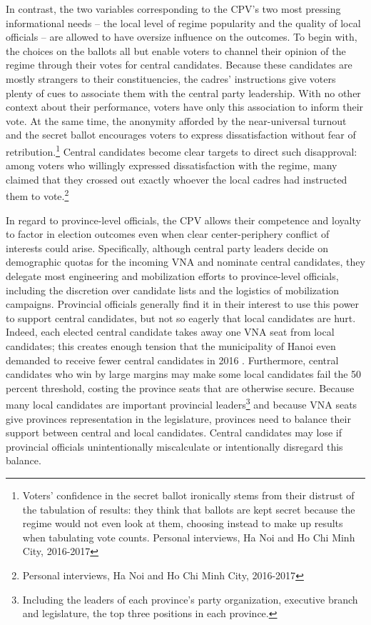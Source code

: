 \documentclass[12pt]{article}
\newcommand{\1}{\mathbbm{1}}
\begin{document}
In contrast, the two variables corresponding to the CPV's two most pressing informational needs -- the local level of regime popularity and the quality of local officials -- are allowed to have oversize influence on the outcomes. To begin with, the choices on the ballots all but enable voters to channel their opinion of the regime through their votes for central candidates. Because these candidates are mostly strangers to their constituencies, the cadres' instructions give voters plenty of cues to associate them with the central party leadership. With no other context about their performance, voters have only this association to inform their vote. At the same time, the anonymity afforded by the near-universal turnout and the secret ballot encourages voters to express dissatisfaction without fear of retribution.\footnote{Voters' confidence in the secret ballot ironically stems from their distrust of the tabulation of results: they think that ballots are kept secret because the regime would not even look at them, choosing instead to make up results when tabulating vote counts. Personal interviews, Ha Noi and Ho Chi Minh City, 2016-2017} Central candidates become clear targets to direct such disapproval: among voters who willingly expressed dissatisfaction with the regime, many claimed that they crossed out exactly whoever the local cadres had instructed them to vote.\footnote{Personal interviews, Ha Noi and Ho Chi Minh City, 2016-2017}

In regard to province-level officials, the CPV allows their competence and loyalty to factor in election outcomes even when clear center-periphery conflict of interests could arise. Specifically, although central party leaders decide on demographic quotas for the incoming VNA and nominate central candidates, they delegate most engineering and mobilization efforts to province-level officials, including the discretion over candidate lists and the logistics of mobilization campaigns. Provincial officials generally find it in their interest to use this power to support central candidates, but not so eagerly that local candidates are hurt. Indeed, each elected central candidate takes away one VNA seat from local candidates; this creates enough tension that the municipality of Hanoi even demanded to receive fewer central candidates in 2016 \citep{vnexpress2016_2}. Furthermore, central candidates who win by large margins may make some local candidates fail the 50 percent threshold, costing the province seats that are otherwise secure. Because many local candidates are important provincial leaders\footnote{Including the leaders of each province's party organization, executive branch and legislature, the top three positions in each province.} and because VNA seats give provinces representation in the legislature, provinces need to balance their support between central and local candidates. Central candidates may lose if provincial officials unintentionally miscalculate or intentionally disregard this balance.
\end{document}
